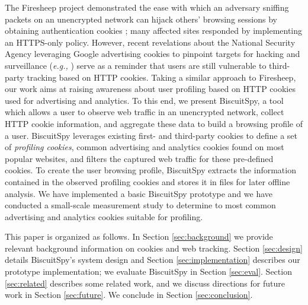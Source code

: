 The Firesheep project\cite{firesheep} demonstrated the ease with which an adversary sniffing packets on an unencrypted network can hijack others' browsing sessions by obtaining authentication cookies \cite{pcworld:firesheep}; many affected sites responded by implementing an HTTPS-only policy.
However, recent revelations about the National Security Agency leveraging Google advertising cookies to pinpoint targets for hacking and surveillance (\emph{e.g.,} \cite{wap:cookies, eff:nsa}) serve as a reminder that users are still vulnerable to third-party tracking based on HTTP cookies.
Taking a similar approach to Firesheep, our work aims at raising awareness about user profiling based on HTTP cookies used for advertising and analytics.
To this end, we present BiscuitSpy, a tool which allows a user to observe web traffic in an unencrypted network, collect HTTP cookie information, and aggregate these data to build a browsing profile of a user.
BiscuitSpy leverages existing first- and third-party cookies to define a set of \emph{profiling cookies}, common advertising and analytics cookies found on most popular websites, and filters the captured web traffic for these pre-defined cookies.
To create the user browsing profile, BiscuitSpy extracts the information contained in the observed profiling cookies and stores it in files for later offline analysis.
We have implemented a basic BiscuitSpy prototype and we have conducted a small-scale measurement study to determine to most common advertising and analytics cookies suitable for profiling.

This paper is organized as follows. In Section \ref{sec:background} we provide relevant background information on cookies and web tracking. Section \ref{sec:design} details BiscuitSpy's system design and Section \ref{sec:implementation} describes our prototype implementation; we evaluate BiscuitSpy in Section \ref{sec:eval}. Section \ref{sec:related} describes some related work, and we discuss directions for future work in Section \ref{sec:future}. We conclude in Section \ref{sec:conclusion}.
